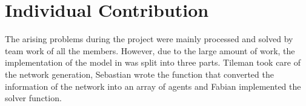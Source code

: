 
\section{Individual Contribution}
\label{sec:individualContrib}

The arising problems during the project were mainly processed and solved by
team work of all the members.  However, due to the large amount of work, the
implementation of the model in \matlab was split into three parts.  Tileman
took care of the network generation, Sebastian wrote the function that
converted the information of the network into an array of agents and Fabian
implemented the solver function.


